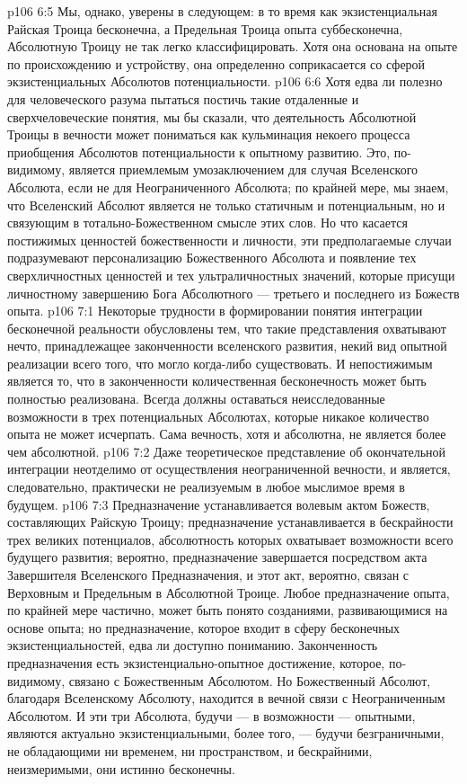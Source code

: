 \vs p106 6:5 Мы, однако, уверены в следующем: в то время как экзистенциальная Райская Троица бесконечна, а Предельная Троица опыта суббесконечна, Абсолютную Троицу не так легко классифицировать. Хотя она основана на опыте по происхождению и устройству, она определенно соприкасается со сферой экзистенциальных Абсолютов потенциальности.
\vs p106 6:6 Хотя едва ли полезно для человеческого разума пытаться постичь такие отдаленные и сверхчеловеческие понятия, мы бы сказали, что деятельность Абсолютной Троицы в вечности может пониматься как кульминация некоего процесса приобщения Абсолютов потенциальности к опытному развитию. Это, по\hyp{}видимому, является приемлемым умозаключением для случая Вселенского Абсолюта, если не для Неограниченного Абсолюта; по крайней мере, мы знаем, что Вселенский Абсолют является не только статичным и потенциальным, но и связующим в тотально\hyp{}Божественном смысле этих слов. Но что касается постижимых ценностей божественности и личности, эти предполагаемые случаи подразумевают персонализацию Божественного Абсолюта и появление тех сверхличностных ценностей и тех ультраличностных значений, которые присущи личностному завершению Бога Абсолютного --- третьего и последнего из Божеств опыта.
\vs p106 7:1 Некоторые трудности в формировании понятия интеграции бесконечной реальности обусловлены тем, что такие представления охватывают нечто, принадлежащее законченности вселенского развития, некий вид опытной реализации всего того, что могло когда\hyp{}либо существовать. И непостижимым является то, что в законченности количественная бесконечность может быть полностью реализована. Всегда должны оставаться неисследованные возможности в трех потенциальных Абсолютах, которые никакое количество опыта не может исчерпать. Сама вечность, хотя и абсолютна, не является более чем абсолютной.
\vs p106 7:2 Даже теоретическое представление об окончательной интеграции неотделимо от осуществления неограниченной вечности, и является, следовательно, практически не реализуемым в любое мыслимое время в будущем.
\vs p106 7:3 \pc Предназначение устанавливается волевым актом Божеств, составляющих Райскую Троицу; предназначение устанавливается в бескрайности трех великих потенциалов, абсолютность которых охватывает возможности всего будущего развития; вероятно, предназначение завершается посредством акта Завершителя Вселенского Предназначения, и этот акт, вероятно, связан с Верховным и Предельным в Абсолютной Троице. Любое предназначение опыта, по крайней мере частично, может быть понято созданиями, развивающимися на основе опыта; но предназначение, которое входит в сферу бесконечных экзистенциальностей, едва ли доступно пониманию. Законченность предназначения есть экзистенциально\hyp{}опытное достижение, которое, по\hyp{}видимому, связано с Божественным Абсолютом. Но Божественный Абсолют, благодаря Вселенскому Абсолюту, находится в вечной связи с Неограниченным Абсолютом. И эти три Абсолюта, будучи --- в возможности --- опытными, являются актуально экзистенциальными, более того, --- будучи безграничными, не обладающими ни временем, ни пространством, и бескрайними, неизмеримыми, они истинно бесконечны.
